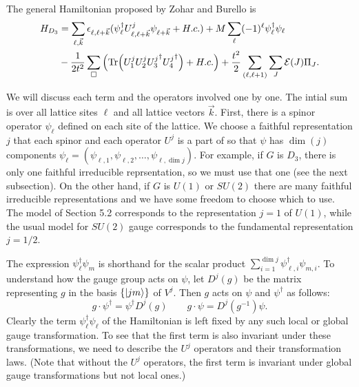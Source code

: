 \documentclass[10pt,reqno]{amsart}
\begin{document}
	The general Hamiltonian proposed by Zohar and Burello is
	\begin{align}
	H_{D_3}&=\sum_{\ell,\vec{k}} \epsilon_{\ell,\ell+\vec{k}}(\psi_\ell^\dagger U_{\ell,\ell+\vec{k}}^j\psi_{\ell+\vec{k}}+H.c.) + M\sum_\ell (-1)^\ell \psi_\ell^\dagger\psi_\ell \nonumber\\ 
	&- \frac{1}{2t^2} \sum_{\Box} \left(\Tr(U_1^j U_2^j {U_3^j}^\dagger {U_4^j}^\dagger) + H.c.\right) + \frac{t^2}{2} \sum_{(\ell,\ell+1)} \sum_{J} \mathcal{E}(J)\Pi_J.
	\end{align}
	
	We will discuss each term and the operators involved one by one.
	The intial sum is over all lattice sites $\ell$ and all lattice vectors $\vec{k}$.
	First, there is a spinor operator $\psi_\ell$ defined on each site of the lattice.
	We choose a faithful representation $j$ that each spinor and each operator $U^j$ is a part of so that $\psi$ has $\dim(j)$ components $\psi_\ell=(\psi_{\ell,1},\psi_{\ell,2},\ldots,\psi_{\ell,\dim j})$.
	For example, if $G$ is $D_3$, there is only one faithful irreducible reprsentation, so we must use that one (see the next subsection).
	On the other hand, if $G$ is $U(1)$ or $SU(2)$ there are many faithful irreducible representations and we have some freedom to choose which to use.
	The model of Section 5.2 corresponds to the representation $j=1$ of $U(1)$, while the usual model for $SU(2)$ gauge corresponds to the fundamental representation $j=1/2$.
	
	The expression $\psi_\ell^\dagger\psi_m$ is shorthand for the scalar product $\sum_{i=1}^{\dim j} \psi^\dagger_{\ell,i} \psi_{m,i}$.
	To understand how the gauge group acts on $\psi$, let $D^j(g)$ be the matrix representing $g$ in the basis $\{\ket{jm}\}$ of $V^j$.
	Then $g$ acts on $\psi$ and $\psi^\dagger$ as follows:
	\begin{equation}
		g \cdot \psi^\dagger = \psi^\dagger D^j(g) \qquad g\cdot \psi = D^j(g^{-1}) \psi.
	\end{equation}
	Clearly the term $\psi_\ell^\dagger\psi_\ell$ of the Hamiltonian is left fixed by any such local or global gauge transformation.
	To see that the first term is also invariant under these transformations, we need to describe the $U^j$ operators and their transformation laws.
	(Note that without the $U^j$ operators, the first term is invariant under global gauge transformations but not local ones.)
	
	
	
\end{document}
